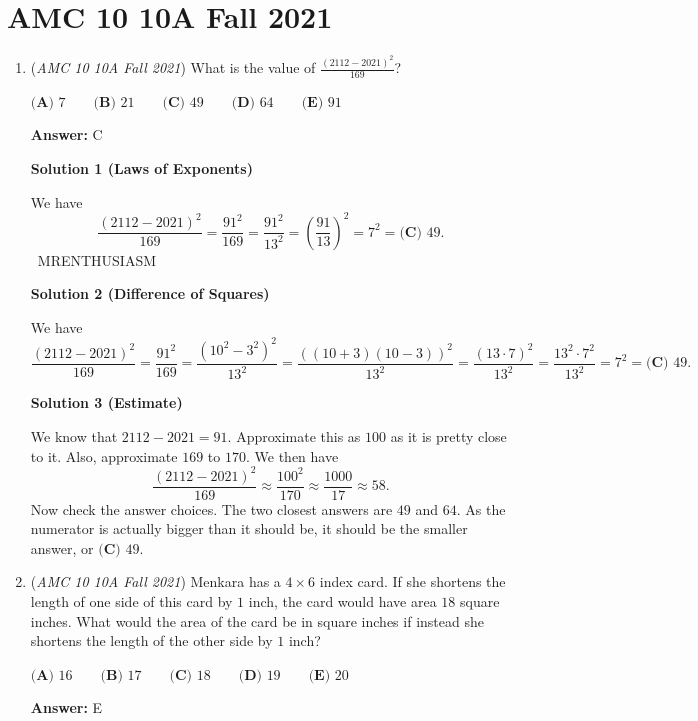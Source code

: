 \section{AMC 10 10A Fall 2021}
        \begin{enumerate}
        	\item (\textit{AMC 10 10A Fall 2021}) What is the value of $\frac{(2112-2021)^2}{169}$?


 $\textbf{(A) } 7 \qquad\textbf{(B) } 21 \qquad\textbf{(C) } 49 \qquad\textbf{(D) } 64 \qquad\textbf{(E) } 91$

 \textbf{Answer: }C



\textbf{Solution 1 (Laws of Exponents)}

We have
 \[\frac{(2112-2021)^2}{169}=\frac{91^2}{169}=\frac{91^2}{13^2}=\left(\frac{91}{13}\right)^2=7^2=\boxed{\textbf{(C) } 49}.\]~MRENTHUSIASM

 



\textbf{Solution 2 (Difference of Squares)}

We have
 \[\frac{(2112-2021)^2}{169}=\frac{91^2}{169}=\frac{(10^2-3^2)^2}{13^2}=\frac{((10+3)(10-3))^2}{13^2}=\frac{(13\cdot7)^2}{13^2}=\frac{13^2 \cdot 7^2}{13^2}=7^2=\boxed{\textbf{(C) } 49}.\]




\textbf{Solution 3 (Estimate)}

We know that $2112-2021 = 91$. Approximate this as $100$ as it is pretty close to it. Also, approximate $169$ to $170$. We then have 
 \[\frac{(2112 - 2021)^2}{169} \approx \frac{100^2}{170} \approx \frac{1000}{17} \approx 58.\]Now check the answer choices. The two closest answers are $49$ and $64$. As the numerator is actually bigger than it should be, it should be the smaller answer, or $\boxed{\textbf{(C) } 49}$.

 


	\item (\textit{AMC 10 10A Fall 2021}) Menkara has a $4 \times 6$ index card. If she shortens the length of one side of this card by $1$ inch, the card would have area $18$ square inches. What would the area of the card be in square inches if instead she shortens the length of the other side by $1$ inch?


 $\textbf{(A) }16\qquad\textbf{(B) }17\qquad\textbf{(C) }18\qquad\textbf{(D) }19\qquad\textbf{(E) }20$

 \textbf{Answer: }E




\end{enumerate}
